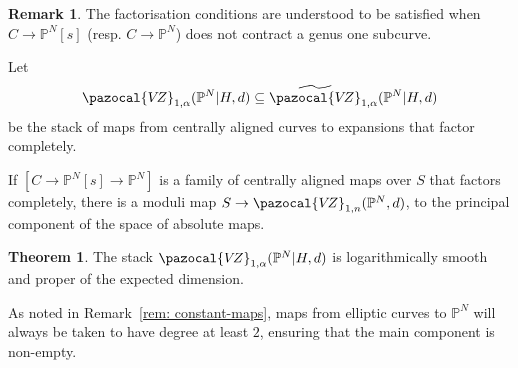\documentclass[11pt]{amsart}
\newcommand{\PP}{\mathbb P}
\newcommand{\VZ}{\pazocal{V\!Z}}
\renewcommand{\to}{\rightarrow}
\theoremstyle{definition}
\newtheorem{thm}{Theorem}[section]
\theoremstyle{definition}
\newtheorem*{rem}{Remark}
\begin{document}
\begin{rem}
 The factorisation conditions are understood to be satisfied when $C\to \mathbb P^N[s]$ (resp. $C\to \mathbb P^N$) does not contract a genus one subcurve. 
\end{rem}

Let
\begin{equation*} \VZ_{1,\alpha}(\mathbb P^N|H,d) \subseteq \widetilde\VZ_{1,\alpha}(\PP^N|H,d) \end{equation*}
be the stack of maps from centrally aligned curves to expansions that factor completely.

If $[C\to \mathbb P^N[s]\to \mathbb P^N]$ is a family of centrally aligned maps over $S$ that factors completely, there is a moduli map $S\to \VZ_{1,n}(\mathbb P^N,d)$, to the principal component of the space of absolute maps. 

\begin{thm}\label{thm: log-smoothness}
The stack $\VZ_{1,\alpha}(\mathbb P^N|H,d)$ is logarithmically smooth and proper of the expected dimension.
\end{thm}

As noted in Remark~\ref{rem: constant-maps}, maps from elliptic curves to $\PP^N$ will always be taken to have degree at least $2$, ensuring that the main component is non-empty. 
\end{document}
